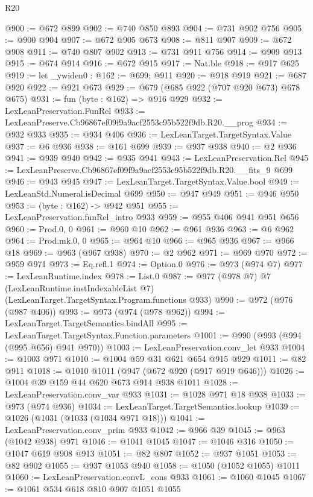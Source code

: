 \begin{lexlean}{R20}
\begin{coremodule}
@900 := @672 @899
@902 := @740 @850 @893
@904 := @731 @902 @756
@905 := @900 @904
@907 := @672 @905 @673
@908 := @811 @907
@909 := @672 @908
@911 := @740 @807 @902
@913 := @731 @911 @756
@914 := @909 @913
@915 := @674 @914
@916 := @672 @915
@917 := Nat.ble
@918 := @917 @625
@919 := let _ywiden0 : @162 := @699; @911
@920 := @918 @919
@921 := @687 @920
@922 := @921 @673
@929 := @679 (@685 @922 (@707 @920 @673) @678 @675)
@931 := fun (byte : @162) => @916 @929
@932 := LexLeanPreservation.FunRel
@933 := LexLeanPreserve.Cb96867ef09f9a9acf2553c95b522f9db.R20.__prog
@934 := @932 @933
@935 := @934 @406
@936 := LexLeanTarget.TargetSyntax.Value
@937 := @6 @936
@938 := @161 @699
@939 := @937 @938
@940 := @2 @936
@941 := @939 @940
@942 := @935 @941
@943 := LexLeanPreservation.Rel
@945 := LexLeanPreserve.Cb96867ef09f9a9acf2553c95b522f9db.R20.__fits_9 @699
@946 := @943 @945
@947 := LexLeanTarget.TargetSyntax.Value.bool
@949 := LexLeanStd.Numeral.isDecimal @699
@950 := @947 @949
@951 := @946 @950
@953 := (byte : @162) -> @942 @951
@955 := LexLeanPreservation.funRel_intro @933
@959 := @955 @406 @941 @951 @656
@960 := Prod.{0, 0}
@961 := @960 @10
@962 := @961 @936
@963 := @6 @962
@964 := Prod.mk.{0, 0}
@965 := @964 @10
@966 := @965 @936
@967 := @966 @18
@969 := @963 (@967 @938)
@970 := @2 @962
@971 := @969 @970
@972 := @959 @971
@973 := Eq.refl.{1}
@974 := Option.{0}
@976 := @973 (@974 @7)
@977 := LexLeanRuntime.index
@978 := List.{0}
@987 := @977
    (@978 @7)
    @7
    (LexLeanRuntime.instIndexableList @7)
    (LexLeanTarget.TargetSyntax.Program.functions @933)
@990 := @972 (@976 (@987 @406))
@993 := @973 (@974 (@978 @962))
@994 := LexLeanTarget.TargetSemantics.bindAll
@995 := LexLeanTarget.TargetSyntax.Function.parameters
@1001 := @990 (@993 (@994 (@995 @656) @941 @970))
@1003 := LexLeanPreservation.conv_let @933
@1004 := @1003 @971
@1010 := @1004 @59 @31 @621 @654 @915 @929
@1011 := @82 @911
@1018 := @1010 @1011 (@947 (@672 @920 (@917 @919 @646)))
@1026 := @1004 @39 @159 @44 @620 @673 @914 @938 @1011
@1028 := LexLeanPreservation.conv_var @933
@1031 := @1028 @971 @18 @938
@1033 := @973 (@974 @936)
@1034 := LexLeanTarget.TargetSemantics.lookup
@1039 := @1026 (@1031 (@1033 (@1034 @971 @18)))
@1041 := LexLeanPreservation.conv_prim @933
@1042 := @966 @39
@1045 := @963 (@1042 @938) @971
@1046 := @1041 @1045
@1047 := @1046 @316
@1050 := @1047 @619 @908 @913
@1051 := @82 @807
@1052 := @937 @1051
@1053 := @82 @902
@1055 := @937 @1053 @940
@1058 := @1050 (@1052 @1055) @1011
@1060 := LexLeanPreservation.convL_cons @933
@1061 := @1060 @1045
@1067 := @1061 @534 @618 @810 @907 @1051 @1055

\end{coremodule}
\end{lexlean}
